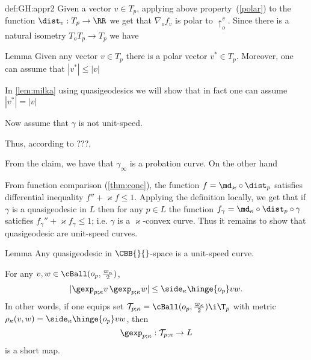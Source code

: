 {\begin{subthm}{def:GH:appr2}
Given a vector $v\in T_p$, applying above property~(\ref{polar}) to the function
$\dist_v:T_p\to\RR$ we get that $\nabla_o f_v$ is polar to $\uparrow_o^v$.
Since there is a natural isometry $T_o T_p\to T_p$ we have

\begin{thm}{Lemma}\label{lem:polar} Given any vector $v\in T_p$ there is a
polar vector $v^*\in T_p$. 
Moreover, one can assume that $|v^*|\le |v|$
\end{thm}

In \ref{lem:milka} using quasigeodesics we will show that in fact one can assume
$|v^*|=|v|$












Now assume that $\gamma$ is not unit-speed.

Thus, according to ???, 



From the claim, we have that $\gamma_\infty$ is a probation curve.
On the other hand 



From function comparison (\ref{thm:conc}), the function $f=\md_\varkappa\circ\dist_p$ satisfies differential inequality $f''+\varkappa f\le 1$.
Applying the definition locally, 
we get that if $\gamma$ is a quasigeodesic in $L$ then for any $p\in L$ the function $f_\gamma=\md_\kappa\circ\dist_p\circ\gamma$ saticfies $f_\gamma''+\varkappa f_\gamma\le 1$; i.e. $\gamma$ is a $\varkappa$-convex curve.
Thus it remains to show that quasigeodesic are unit-speed curves.

\begin{thm}{Lemma}
\label{thm:unit-speed} Any quasigeodesic in $\CBB{}{}$-space is a unit-speed curve. 
\end{thm}



























For any $v,w\in \cBall(o_p,\tfrac{\varpi_\kappa}2)$,
$$|\gexp_{p;\kappa}v\,\gexp_{p;\kappa}w|\le\side_\kappa\hinge{o_p}v w.$$
In other words, if one equips set $\mathcal{T}_{p;\kappa}=\cBall(o_p,\tfrac{\varpi_\kappa}2)\i \T_p$ with metric $\rho_\kappa(v,w)=\side_\kappa\hinge{o_p}v w$, then 
$$\gexp_{p;\kappa}:\mathcal{T}_{p;\kappa}\to L$$ 
is a short map.




\end{subthm}}
